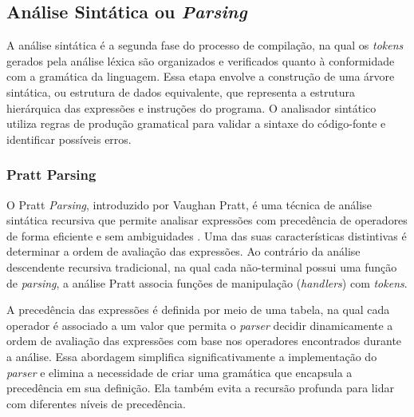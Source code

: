 \documentclass[english, 
               brazil, 
               bsc] %
               {dcomp-abntex2}
\begin{document}
\subsection{Análise Sintática ou \textit{Parsing}}
A análise sintática é a segunda fase do processo de compilação, na qual os \textit{tokens} gerados pela análise léxica são organizados e verificados quanto à conformidade com a gramática da linguagem. Essa etapa envolve a construção de uma árvore sintática, ou estrutura de dados equivalente, que representa a estrutura hierárquica das expressões e instruções do programa. O analisador sintático utiliza regras de produção gramatical para validar a sintaxe do código-fonte e identificar possíveis erros.


\subsubsection{Pratt Parsing}
O Pratt \textit{Parsing}, introduzido por Vaughan Pratt, é uma técnica de análise sintática recursiva que permite analisar expressões com precedência de operadores de forma eficiente e sem ambiguidades \cite{pratt}. Uma das suas características distintivas é determinar a ordem de avaliação das expressões. Ao contrário da análise descendente recursiva tradicional, na qual cada não-terminal possui uma função de \textit{parsing}, a análise Pratt associa funções de manipulação (\textit{handlers}) com \textit{tokens}.


A precedência das expressões é definida por meio de uma tabela, na qual cada operador é associado a um valor que permita o \textit{parser} decidir dinamicamente a ordem de avaliação das expressões com base nos operadores encontrados durante a análise. Essa abordagem simplifica significativamente a implementação do \textit{parser} e elimina a necessidade de criar uma gramática que encapsula a precedência em sua definição. Ela também evita a recursão profunda para lidar com diferentes níveis de precedência.
\end{document}
